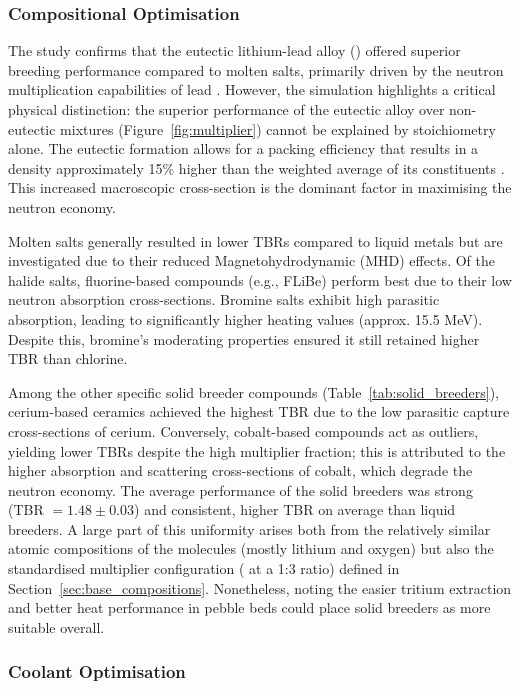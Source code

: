 \documentclass[12pt]{article}
\begin{document}
\subsubsection{Compositional Optimisation}

The study confirms that the eutectic lithium-lead alloy () offered superior breeding
performance compared to molten salts, primarily driven by the neutron multiplication capabilities of
lead \cite{malang_self-cooled_1991}. However, the simulation highlights a critical physical
distinction: the superior performance of the eutectic alloy over non-eutectic mixtures
(Figure~\ref{fig:multiplier}) cannot be explained by stoichiometry alone. The eutectic formation
allows for a packing efficiency that results in a density approximately 15\% higher than the
weighted average of its constituents \cite{mas_de_les_valls_leadlithium_2008}. This increased
macroscopic cross-section is the dominant factor in maximising the neutron economy.

Molten salts generally resulted in lower TBRs compared to liquid metals but are investigated due to
their reduced Magnetohydrodynamic (MHD) effects. Of the halide salts, fluorine-based compounds
(e.g., FLiBe) perform best due to their low neutron absorption cross-sections. Bromine salts exhibit
high parasitic absorption, leading to significantly higher heating values (approx. 15.5 MeV).
Despite this, bromine's moderating properties ensured it still retained higher TBR than chlorine.

Among the other specific solid breeder compounds (Table~\ref{tab:solid_breeders}), cerium-based
ceramics achieved the highest TBR due to the low parasitic capture cross-sections of cerium.
Conversely, cobalt-based compounds act as outliers, yielding lower TBRs despite the high multiplier
fraction; this is attributed to the higher absorption and scattering cross-sections of cobalt, which
degrade the neutron economy. The average performance of the solid breeders was strong (TBR $= 1.48
\pm 0.03$) and consistent, higher TBR on average than liquid breeders. A large part of this
uniformity arises both from the relatively similar atomic compositions of the molecules (mostly
lithium and oxygen) but also the standardised multiplier configuration ( at a 1:3 ratio)
defined in Section~\ref{sec:base_compositions}. Nonetheless, noting the easier tritium extraction
and better heat performance in pebble beds \cite{knitter_recent_2013} could place solid breeders as
more suitable overall.

\subsubsection{Coolant Optimisation}
\end{document}

